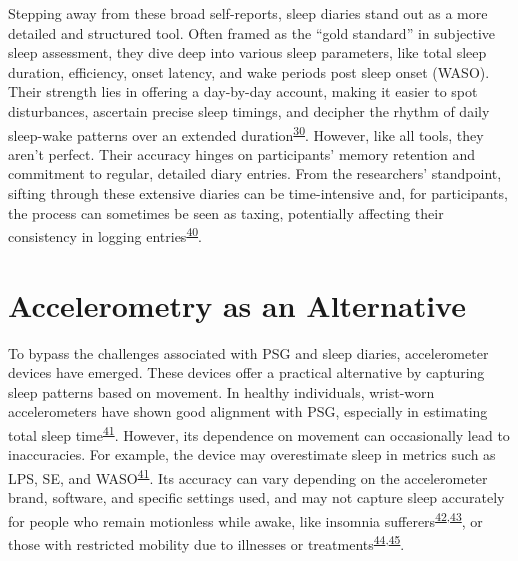 \documentclass[
  9pt,
]{scrbook}
\begin{document}
Stepping away from these broad self-reports, sleep diaries stand out as
a more detailed and structured tool. Often framed as the ``gold
standard'' in subjective sleep assessment, they dive deep into various
sleep parameters, like total sleep duration, efficiency, onset latency,
and wake periods post sleep onset (WASO). Their strength lies in
offering a day-by-day account, making it easier to spot disturbances,
ascertain precise sleep timings, and decipher the rhythm of daily
sleep-wake patterns over an extended
duration\textsuperscript{\protect\hyperlink{ref-ibuxe1uxf1ez_2018}{30}}.
However, like all tools, they aren't perfect. Their accuracy hinges on
participants' memory retention and commitment to regular, detailed diary
entries. From the researchers' standpoint, sifting through these
extensive diaries can be time-intensive and, for participants, the
process can sometimes be seen as taxing, potentially affecting their
consistency in logging
entries\textsuperscript{\protect\hyperlink{ref-thurman_2018}{40}}.

\hypertarget{accelerometry-as-an-alternative}{%
\section{Accelerometry as an
Alternative}\label{accelerometry-as-an-alternative}}

To bypass the challenges associated with PSG and sleep diaries,
accelerometer devices have emerged. These devices offer a practical
alternative by capturing sleep patterns based on movement. In healthy
individuals, wrist-worn accelerometers have shown good alignment with
PSG, especially in estimating total sleep
time\textsuperscript{\protect\hyperlink{ref-van_de_water_objective_2011}{41}}.
However, its dependence on movement can occasionally lead to
inaccuracies. For example, the device may overestimate sleep in metrics
such as LPS, SE, and
WASO\textsuperscript{\protect\hyperlink{ref-van_de_water_objective_2011}{41}}.
Its accuracy can vary depending on the accelerometer brand, software,
and specific settings used, and may not capture sleep accurately for
people who remain motionless while awake, like insomnia
sufferers\textsuperscript{\protect\hyperlink{ref-lichstein_2006}{42},\protect\hyperlink{ref-taibi_2013}{43}},
or those with restricted mobility due to illnesses or
treatments\textsuperscript{\protect\hyperlink{ref-ancoli-israel_1997}{44},\protect\hyperlink{ref-beecroft_2008}{45}}.
\end{document}
